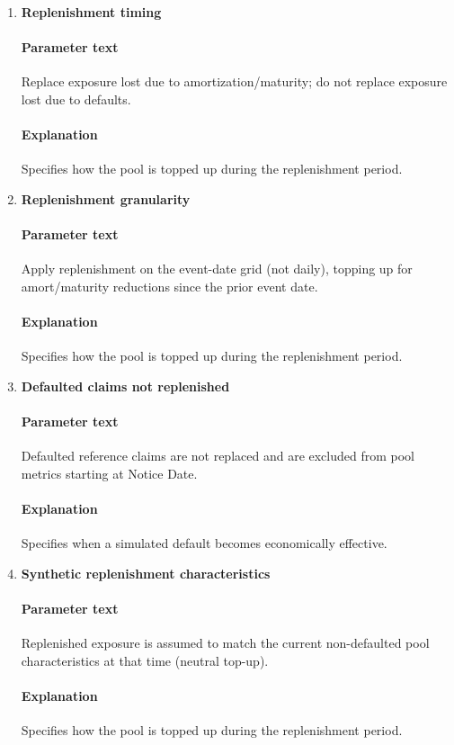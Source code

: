 \documentclass[11pt]{article}
\begin{document}
\begin{enumerate}[label=\arabic*),leftmargin=*,align=left]
\item \textbf{Replenishment timing}
\paragraph{Parameter text} Replace exposure lost due to amortization/maturity; do not replace exposure lost due to defaults.
\paragraph{Explanation} Specifies how the pool is topped up during the replenishment period.

\item \textbf{Replenishment granularity}
\paragraph{Parameter text} Apply replenishment on the event-date grid (not daily), topping up for amort/maturity reductions since the prior event date.
\paragraph{Explanation} Specifies how the pool is topped up during the replenishment period.

\item \textbf{Defaulted claims not replenished}
\paragraph{Parameter text} Defaulted reference claims are not replaced and are excluded from pool metrics starting at Notice Date.
\paragraph{Explanation} Specifies when a simulated default becomes economically effective.

\item \textbf{Synthetic replenishment characteristics}
\paragraph{Parameter text} Replenished exposure is assumed to match the current non-defaulted pool characteristics at that time (neutral top-up).
\paragraph{Explanation} Specifies how the pool is topped up during the replenishment period.


\end{enumerate}
\end{document}
